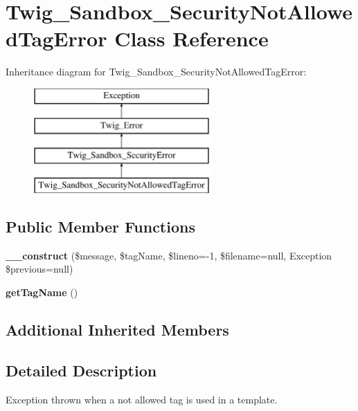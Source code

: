 \hypertarget{classTwig__Sandbox__SecurityNotAllowedTagError}{}\section{Twig\+\_\+\+Sandbox\+\_\+\+Security\+Not\+Allowed\+Tag\+Error Class Reference}
\label{classTwig__Sandbox__SecurityNotAllowedTagError}
Inheritance diagram for Twig\+\_\+\+Sandbox\+\_\+\+Security\+Not\+Allowed\+Tag\+Error\+:\begin{figure}[H]
\begin{center}
\leavevmode
\includegraphics[height=4.000000cm]{classTwig__Sandbox__SecurityNotAllowedTagError}
\end{center}
\end{figure}
\subsection*{Public Member Functions}
\begin{DoxyCompactItemize}
\item 
{\bfseries \+\_\+\+\_\+construct} (\$message, \$tag\+Name, \$lineno=-\/1, \$filename=null, Exception \$previous=null)\hypertarget{classTwig__Sandbox__SecurityNotAllowedTagError_a83cb92478498e75a6af0fbf1339e3647}{}\label{classTwig__Sandbox__SecurityNotAllowedTagError_a83cb92478498e75a6af0fbf1339e3647}

\item 
{\bfseries get\+Tag\+Name} ()\hypertarget{classTwig__Sandbox__SecurityNotAllowedTagError_ae62ed216f180352e1f8c42cafa006386}{}\label{classTwig__Sandbox__SecurityNotAllowedTagError_ae62ed216f180352e1f8c42cafa006386}

\end{DoxyCompactItemize}
\subsection*{Additional Inherited Members}


\subsection{Detailed Description}
Exception thrown when a not allowed tag is used in a template.

